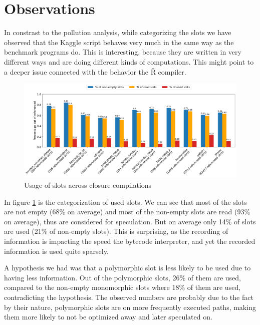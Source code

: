 \section{Observations}

In constrast to the pollution analysis, while categorizing the slots we have observed that the Kaggle script behaves very much in the same way as the benchmark programs do. This is interesting, because they are written in very different ways and are doing different kinds of computations. This might point to a deeper issue connected with the behavior the Ř compiler.

\begin{figure}[t]
	\centering
	\begin{adjustwidth}{-3cm}{-3cm}
		\includegraphics[width=1.5\textwidth]{figures/usage_overall.pdf}
	\end{adjustwidth}
	\caption{Usage of slots across closure compilations}\label{fig:graph-overview}
\end{figure}

In figure \ref{fig:graph-overview} is the categorization of used slots. We can see that most of the slots are not empty (68\% on average) and most of the non-empty slots are read (93\% on average), thus are considered for speculation. But on average only 14\% of slots are used (21\% of non-empty slots). This is surprising, as the recording of information is impacting the speed the bytecode interpreter, and yet the recorded information is used quite sparsely.

A hypothesis we had was that a polymorphic slot is less likely to be used due to having less information. Out of the polymorphic slots, 26\% of them are used, compared to the non-empty monomorphic slots where 18\% of them are used, contradicting the hypothesis. The observed numbers are probably due to the fact by their nature, polymorphic slots are on more frequently executed paths, making them more likely to not be optimized away and later speculated on.

